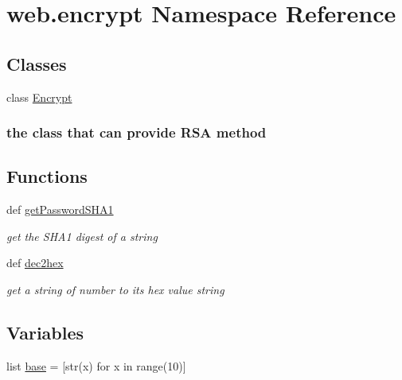 \hypertarget{namespaceweb_1_1encrypt}{\section{web.\-encrypt Namespace Reference}
\label{namespaceweb_1_1encrypt}
}
\subsection*{Classes}
\begin{DoxyCompactItemize}
\item 
class \hyperlink{classweb_1_1encrypt_1_1_encrypt}{Encrypt}
\begin{DoxyCompactList}\small\item\em \subsubsection*{the class that can provide R\-S\-A method }\end{DoxyCompactList}\end{DoxyCompactItemize}
\subsection*{Functions}
\begin{DoxyCompactItemize}
\item 
def \hyperlink{namespaceweb_1_1encrypt_ae4d7771815eeeeabd03fca816957e9e4}{get\-Password\-S\-H\-A1}
\begin{DoxyCompactList}\small\item\em get the S\-H\-A1 digest of a string \end{DoxyCompactList}\item 
def \hyperlink{namespaceweb_1_1encrypt_ad5ae70ccfca1e62305799c3559acfc09}{dec2hex}
\begin{DoxyCompactList}\small\item\em get a string of number to its hex value string \end{DoxyCompactList}\end{DoxyCompactItemize}
\subsection*{Variables}
\begin{DoxyCompactItemize}
\item 
list \hyperlink{namespaceweb_1_1encrypt_a1d14d72c54edd236061a28d9dfe208ed}{base} = \mbox{[}str(x) for x in range(10)\mbox{]}
\end{DoxyCompactItemize}


